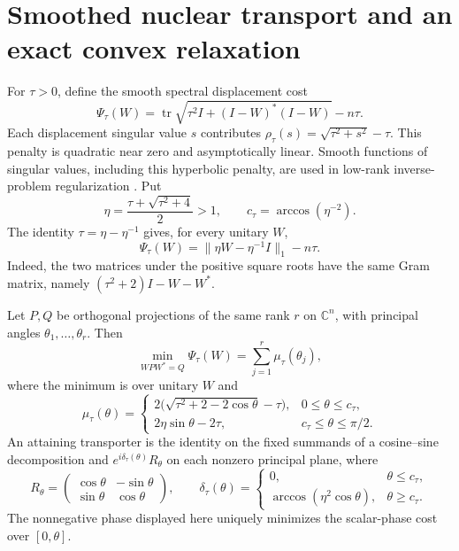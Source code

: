 \section{Smoothed nuclear transport and an exact convex relaxation}
\label{sec:smoothed-transport}

For $\tau>0$, define the smooth spectral displacement cost
\[
 \Psi_\tau(W)=\operatorname{tr}
  \sqrt{\tau^2I+(I-W)^*(I-W)}-n\tau.
\]
Each displacement singular value $s$ contributes
$\rho_\tau(s)=\sqrt{\tau^2+s^2}-\tau$. This penalty is quadratic near
zero and asymptotically linear. Smooth functions of singular values,
including this hyperbolic penalty, are used in low-rank inverse-problem
regularization \citep{lobos2026smooth}. Put
\[
 \eta=\frac{\tau+\sqrt{\tau^2+4}}2>1,
 \qquad c_\tau=\arccos(\eta^{-2}).
\]
The identity $\tau=\eta-\eta^{-1}$ gives, for every unitary $W$,
\begin{equation}
 \Psi_\tau(W)=\|\eta W-\eta^{-1}I\|_1-n\tau.
 \label{eq:smoothed-weighted-nuclear}
\end{equation}
Indeed, the two matrices under the positive square roots have the same
Gram matrix, namely $(\tau^2+2)I-W-W^*$.

\begin{theorem}
\label{thm:smoothed-transport}
Let $P,Q$ be orthogonal projections of the same rank $r$ on
$\mathbb C^n$, with principal angles $\theta_1,\ldots,\theta_r$.
Then
\begin{equation}
 \min_{WPW^*=Q}\Psi_\tau(W)=\sum_{j=1}^r \mu_\tau(\theta_j),
 \label{eq:smoothed-global-minimum}
\end{equation}
where the minimum is over unitary $W$ and
\[
 \mu_\tau(\theta)=
 \begin{cases}
  2\bigl(\sqrt{\tau^2+2-2\cos\theta}-\tau\bigr),
        &0\leq\theta\leq c_\tau,\\
  2\eta\sin\theta-2\tau,
        &c_\tau\leq\theta\leq\pi/2.
 \end{cases}
\]
An attaining transporter is the identity on the fixed summands of a
cosine--sine decomposition and $e^{i\delta_\tau(\theta)}R_\theta$ on
each nonzero principal plane, where
\[
 R_\theta=\begin{pmatrix}\cos\theta&-\sin\theta\\
                              \sin\theta&\cos\theta\end{pmatrix},
 \qquad
 \delta_\tau(\theta)=
 \begin{cases}
   0,&\theta\leq c_\tau,\\
   \arccos(\eta^2\cos\theta),&\theta\geq c_\tau.
 \end{cases}
\]
The nonnegative phase displayed here uniquely minimizes the scalar-phase
cost over $[0,\theta]$.
\end{theorem}

